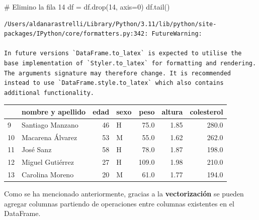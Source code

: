 \documentclass[
  letterpaper,
  DIV=11,
  numbers=noendperiod]{scrreprt}
\newenvironment{Shaded}{\begin{snugshade}}{\end{snugshade}}
\newcommand{\CommentTok}[1]{\textcolor[rgb]{0.37,0.37,0.37}{#1}}
\newcommand{\DecValTok}[1]{\textcolor[rgb]{0.68,0.00,0.00}{#1}}
\newcommand{\NormalTok}[1]{\textcolor[rgb]{0.00,0.23,0.31}{#1}}
\newcommand{\OperatorTok}[1]{\textcolor[rgb]{0.37,0.37,0.37}{#1}}
\begin{document}
\begin{Shaded}
\begin{Highlighting}[]
\CommentTok{\# Elimino la fila 14}
\NormalTok{df }\OperatorTok{=}\NormalTok{ df.drop(}\DecValTok{14}\NormalTok{, axis}\OperatorTok{=}\DecValTok{0}\NormalTok{) }
\NormalTok{df.tail()}
\end{Highlighting}
\end{Shaded}

\begin{verbatim}
/Users/aldanarastrelli/Library/Python/3.11/lib/python/site-packages/IPython/core/formatters.py:342: FutureWarning:

In future versions `DataFrame.to_latex` is expected to utilise the base implementation of `Styler.to_latex` for formatting and rendering. The arguments signature may therefore change. It is recommended instead to use `DataFrame.style.to_latex` which also contains additional functionality.
\end{verbatim}

\begin{tabular}{llrlrrr}
\toprule
{} & nombre y apellido &  edad & sexo &   peso &  altura &  colesterol \\
\midrule
9  &  Santiago Manzano &    46 &    H &   75.0 &    1.85 &       280.0 \\
10 &  Macarena Álvarez &    53 &    M &   55.0 &    1.62 &       262.0 \\
11 &         José Sanz &    58 &    H &   78.0 &    1.87 &       198.0 \\
12 &  Miguel Gutiérrez &    27 &    H &  109.0 &    1.98 &       210.0 \\
13 &   Carolina Moreno &    20 &    M &   61.0 &    1.77 &       194.0 \\
\bottomrule
\end{tabular}

\begin{tcolorbox}[enhanced jigsaw, bottomrule=.15mm, leftrule=.75mm, opacityback=0, colback=white, toprule=.15mm, bottomtitle=1mm, opacitybacktitle=0.6, rightrule=.15mm, left=2mm, arc=.35mm, coltitle=black, title=\textcolor{quarto-callout-tip-color}{\faLightbulb}\hspace{0.5em}{\textbf{Agregar columnas con operaciones}}, breakable, toptitle=1mm, colframe=quarto-callout-tip-color-frame, titlerule=0mm, colbacktitle=quarto-callout-tip-color!10!white]

Como se ha mencionado anteriormente, gracias a la \textbf{vectorización}
se pueden agregar columnas partiendo de operaciones entre columnas
existentes en el DataFrame.

\end{tcolorbox}
\end{document}
